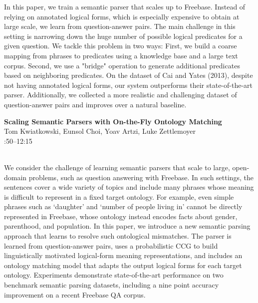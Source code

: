 \documentclass[twoside,makeidx]{book}
\renewcommand{\normalsize}{\fontsize{8}{9}\selectfont}
\renewcommand{\small}{\fontsize{7}{8}\selectfont}
\begin{document}
\nopagebreak%
\noindent%
{\small In this paper, we train a semantic parser that scales up to Freebase. Instead of relying on annotated logical forms, which is especially expensive to obtain at large scale, we learn from question-answer pairs. The main challenge in this setting is narrowing down the huge number of possible logical predicates for a given question. We tackle this problem in two ways: First, we build a coarse mapping from phrases to predicates using a knowledge base and a large text corpus. Second, we use a "bridge" operation to generate additional predicates based on neighboring predicates. On the dataset of Cai and Yates (2013), despite not having annotated logical forms, our system outperforms their state-of-the-art parser. Additionally, we collected a more realistic and challenging dataset of question-answer pairs and improves over a natural baseline.}
\par\vspace{2em}\noindent%
\begin{minipage}{\linewidth}%
\begin{center}
\textbf{\normalsize Scaling Semantic Parsers with On-the-Fly Ontology Matching}\\
\normalsize  Tom Kwiatkowski,  Eunsol Choi,  Yoav Artzi,  Luke Zettlemoyer\\
{\small 11:50--12:15}\\
\end{center}
\end{minipage}\\[0.5em]
\nopagebreak%
\noindent%
{\small We consider the challenge of learning semantic parsers that scale to large, open-domain problems, such as question answering  with Freebase. In such settings, the sentences cover a wide variety of topics and include many  phrases whose meaning is difficult to represent in a fixed target ontology. For example, even simple phrases such as `daughter' and `number of people living in' cannot be directly represented in Freebase, whose ontology instead encodes facts about gender, parenthood, and population. In this paper, we introduce a new semantic parsing approach that learns to resolve such ontological mismatches. The parser is learned from question-answer pairs, uses a probabilistic CCG to build linguistically motivated logical-form meaning representations, and includes an ontology matching model that adapts the output logical forms for each target ontology.  Experiments demonstrate state-of-the-art performance on two benchmark semantic parsing datasets, including a nine point accuracy improvement on a recent Freebase QA corpus.}
\end{document}
